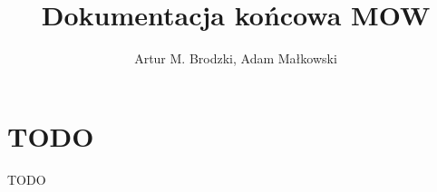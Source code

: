\documentclass{article}
\author{Artur M. Brodzki, Adam Małkowski}
\title{Dokumentacja końcowa MOW}
\begin{document}
	\maketitle
	
	\section{TODO}
	TODO
\end{document}
